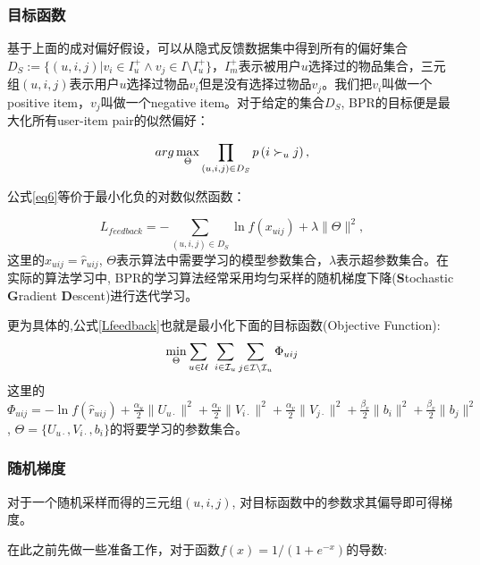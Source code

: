 \subsubsection{目标函数}

基于上面的成对偏好假设，可以从隐式反馈数据集中得到所有的偏好集合$D_S := \{\left(u,i,j\right) | v_i \in I_{u}^+ \wedge v_j \in I \setminus I_{u}^+\}$，$I_m^+$表示被用户$u$选择过的物品集合，三元组$\left(u,i,j\right)$表示用户$u$选择过物品$v_i$但是没有选择过物品$v_j$。我们把$v_i$叫做一个positive item，$v_j$叫做一个negative item。对于给定的集合$D_S$, BPR的目标便是最大化所有user-item pair的似然偏好：

\begin{equation}
\label{eq6}
arg \max_{\substack \Theta } \prod_{\left(u,i,j\right) \in D_S} p\left(i \succ_u j\right),
\end{equation}

公式\eqref{eq6}等价于最小化负的对数似然函数：

\begin{equation}
\label{Lfeedback}
L_{feedback} = - \sum_{\left(u,i,j\right) \in D_S}\ln f \left( x_{uij}\right) + \lambda\|\Theta\|^2,
\end{equation}
这里的$x_{uij} = \hat{r}_{uij}$, $\Theta$表示算法中需要学习的模型参数集合，$\lambda$表示超参数集合。在实际的算法学习中, BPR的学习算法经常采用均匀采样的随机梯度下降(\textbf{S}tochastic \textbf{G}radient \textbf{D}escent)进行迭代学习。

更为具体的,公式\eqref{Lfeedback}也就是最小化下面的目标函数(Objective Function): 
\begin{equation}
\label{eq8}
\min_{\substack\Theta}\sum_{u\in\mathcal{U}} \ \sum_{i\in\mathcal{I}_u}\sum_{j\in\mathcal{I}\setminus\mathcal{I}_u}\Phi_{uij}
\end{equation}
这里的
$\Phi_{uij}
= 
- \ln f \left(\hat{r}_{uij}\right) 
+ \frac{\alpha_u}{2}\|U_{u\cdot}\|^2
+ \frac{\alpha_v}{2}\|V_{i\cdot}\|^2
+ \frac{\alpha_v}{2}\|V_{j\cdot}\|^2
+ \frac{\beta_v}{2}\|b_{i}\|^2
+ \frac{\beta_v}{2}\|b_{j}\|^2$, $\Theta = \{U_{u\cdot},V_{i\cdot},b_i\}
$的将要学习的参数集合。


\subsubsection{随机梯度}
对于一个随机采样而得的三元组$\left(u,i,j\right)$, 对目标函数中的参数求其偏导即可得梯度。

在此之前先做一些准备工作，对于函数$f(x) = 1/\left(1+e^{-x}\right)$的导数:

